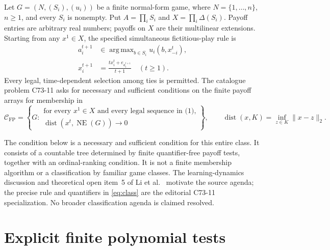 \documentclass[11pt,a4paper]{article}
\theoremstyle{definition}
\newcommand{\CFP}{\mathcal C_{\mathrm{FP}}}
\DeclareMathOperator{\NE}{NE}
\DeclareMathOperator{\dist}{dist}
\DeclareMathOperator*{\argmax}{arg\,max}
\begin{document}
Let $G=(N,(S_i),(u_i))$ be a finite normal-form game, where
$N=\{1,\ldots,n\}$, $n\ge1$, and every $S_i$ is nonempty. Put
$A=\prod_iS_i$ and $X=\prod_i\Delta(S_i)$. Payoff entries are arbitrary
real numbers; payoffs on $X$ are their multilinear extensions. Starting
from any $x^1\in X$, the specified simultaneous fictitious-play rule is
\begin{equation}\label{eq:fp}
 \begin{aligned}
 a_i^{t+1}&\in\argmax_{b\in S_i}u_i(b,x_{-i}^t),\\
 x_i^{t+1}&=\frac{t x_i^t+e_{a_i^{t+1}}}{t+1}\quad(t\ge1).
 \end{aligned}
\end{equation}
Every legal, time-dependent selection among ties is permitted. The
catalogue problem C73-11 asks for necessary and sufficient conditions on
the finite payoff arrays for membership in
\begin{equation}\label{eq:class}
 \CFP=\left\{G:
 \begin{array}{l}
\text{for every }x^1\in X\text{ and every legal sequence in (1),}\\[-2pt]
 \displaystyle\dist(x^t,\NE(G))\longrightarrow0
 \end{array}\right\},
 \qquad
 \dist(x,K)=\inf_{z\in K}\|x-z\|_2.
\end{equation}

The condition below is a necessary and sufficient condition for this
entire class. It consists of a countable tree determined by finite
quantifier-free payoff tests, together with an ordinal-ranking condition.
It is not a finite membership algorithm or a classification by familiar
game classes. The learning-dynamics discussion and theoretical open item~5
of Li et al.~\cite{li} motivate the source agenda; the precise rule and
quantifiers in \eqref{eq:class} are the editorial C73-11 specialization.
No broader classification agenda is claimed resolved.

\section{Explicit finite polynomial tests}
\end{document}
